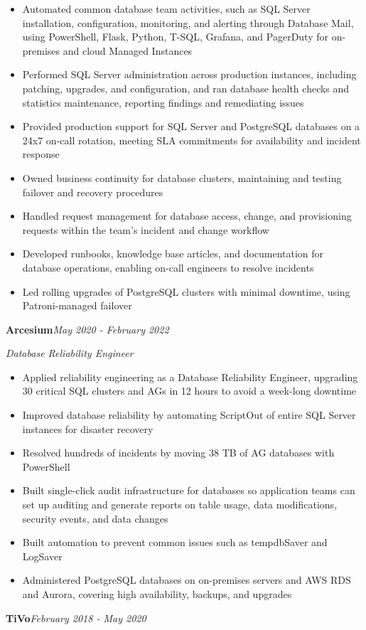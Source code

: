 \documentclass[10pt,a4paper]{article}
\begin{document}
\begin{itemize}
  \item Automated common database team activities, such as SQL Server installation, configuration, monitoring, and alerting through Database Mail, using PowerShell, Flask, Python, T-SQL, Grafana, and PagerDuty for on-premises and cloud Managed Instances
  \item Performed SQL Server administration across production instances, including patching, upgrades, and configuration, and ran database health checks and statistics maintenance, reporting findings and remediating issues
  \item Provided production support for SQL Server and PostgreSQL databases on a 24x7 on-call rotation, meeting SLA commitments for availability and incident response
  \item Owned business continuity for database clusters, maintaining and testing failover and recovery procedures
  \item Handled request management for database access, change, and provisioning requests within the team's incident and change workflow
  \item Developed runbooks, knowledge base articles, and documentation for database operations, enabling on-call engineers to resolve incidents
  \item Led rolling upgrades of PostgreSQL clusters with minimal downtime, using Patroni-managed failover
\end{itemize}
\vspace{14.7pt}
\noindent\textbf{Arcesium}\hfill \textit{May 2020 - February 2022}

\textit{Database Reliability Engineer}\\[-5pt]
\begin{itemize}
  \item Applied reliability engineering as a Database Reliability Engineer, upgrading 30 critical SQL clusters and AGs in 12 hours to avoid a week-long downtime
  \item Improved database reliability by automating ScriptOut of entire SQL Server instances for disaster recovery
  \item Resolved hundreds of incidents by moving 38 TB of AG databases with PowerShell
  \item Built single-click audit infrastructure for databases so application teams can set up auditing and generate reports on table usage, data modifications, security events, and data changes
  \item Built automation to prevent common issues such as tempdbSaver and LogSaver
  \item Administered PostgreSQL databases on on-premises servers and AWS RDS and Aurora, covering high availability, backups, and upgrades
\end{itemize}
\vspace{14.7pt}
\noindent\textbf{TiVo}\hfill \textit{February 2018 - May 2020}
\end{document}
